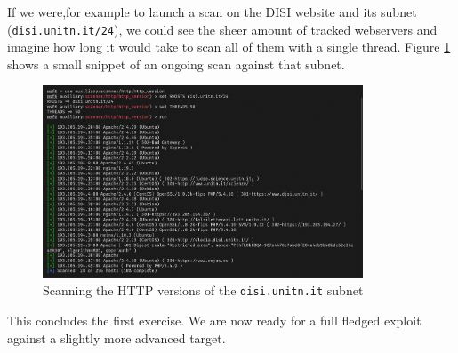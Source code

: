 If we were,for example to launch a scan on the DISI website and its subnet (\texttt{disi.unitn.it/24}), we could see the sheer amount of tracked webservers and imagine how long it would take to scan all of them with a single thread. Figure \ref{fig:ex1:http-disi} shows a small snippet of an ongoing scan against that subnet.

\begin{figure}[htbp]
	\centering
	\includegraphics[width=0.85\textwidth]{../drawable/exercise_1_screenshots/es1-http-disi.png}
	\caption{Scanning the HTTP versions of the \texttt{disi.unitn.it} subnet}
	\label{fig:ex1:http-disi}
\end{figure}

This concludes the first exercise. We are now ready for a full fledged exploit against a slightly more advanced target.

\clearpage